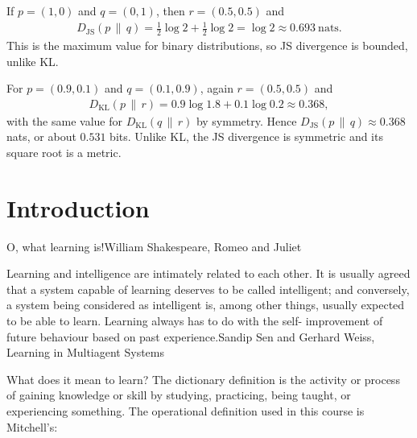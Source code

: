 \documentclass[a4paper, 12pt]{book}
\begin{document}
\begin{example}
    If $p=(1,0)$ and $q=(0,1)$, then $r=(0.5,0.5)$ and
    \begin{align}
        D_{\mathrm{JS}}(p\,\|\,q) = \tfrac12\log 2+\tfrac12\log 2 = \log 2\approx0.693~\text{nats}.
    \end{align}
    This is the maximum value for binary distributions, so JS divergence is bounded, unlike KL.
\end{example}

\begin{example}
    For $p=(0.9,0.1)$ and $q=(0.1,0.9)$, again $r=(0.5,0.5)$ and
    \begin{align}
        D_{\mathrm{KL}}(p\,\|\,r) = 0.9\log 1.8+0.1\log 0.2 \approx0.368,
    \end{align}
    with the same value for $D_{\mathrm{KL}}(q\,\|\,r)$ by symmetry. Hence $D_{\mathrm{JS}}(p\,\|\,q)\approx0.368$ nats, or about $0.531$ bits. Unlike KL, the JS divergence is symmetric and its square root is a metric.
\end{example}


\chapter{Introduction}
\label{ch:intro}

\begin{epigraph}
    {O, what learning is!}{William Shakespeare, Romeo and Juliet}
\end{epigraph}


\begin{epigraph}
    {Learning and intelligence are intimately related to each other. It is usually agreed that a system capable of learning deserves to be called intelligent; and conversely, a system being considered as intelligent is, among other things, usually expected to be able to learn. Learning always has to do with the self- improvement of future behaviour based on past experience.}{Sandip Sen and Gerhard Weiss, Learning in Multiagent Systems}
\end{epigraph}

What does it mean to learn? The dictionary definition is the activity or process of
gaining knowledge or skill by studying, practicing, being taught, or experiencing
something. The operational definition used in this course is Mitchell's:
\end{document}
